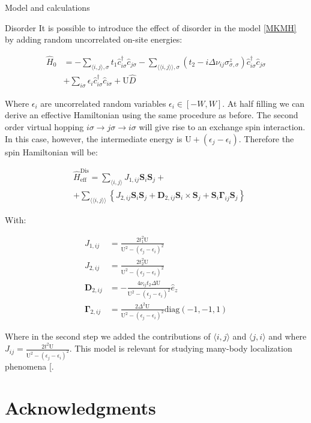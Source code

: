 \documentclass[aps,prl,twocolumn,amsmath,amssymb,superscriptaddress,nobibnotes]{revtex4}%
\renewcommand{\cite}[1]{{[}\onlinecite{#1}{]}}
\newcommand{\n}{\nonumber}
\newcommand{\bs}{\boldsymbol}
\begin{document}
\begin{section}{Model and calculations}
\begin{subsection}{Disorder}
It is possible to introduce the effect of disorder in the model \ref{MKMH} by adding random uncorrelated on-site energies:

\begin{align}
\label{DisorderedHubbardModel}
\hat{H}_0 &= - \sum_{\langle i,j \rangle, \sigma} t_1\hat{c}_{i \sigma}^\dagger \hat{c}_{j \sigma} -\sum_{\langle \langle i,j \rangle \rangle, \sigma}(t_2 - i\Delta\nu_{ij}\sigma^z_{\sigma, \sigma})\hat{c}_{i \sigma}^\dagger \hat{c}_{j \sigma} \n \\
	& + \sum_{i \sigma} \epsilon_i \hat{c}_{i \sigma}^\dagger \hat{c}_{i \sigma} +
	\text{U}\hat{D}
\end{align}

Where $\epsilon_i$ are uncorrelated random variables $\epsilon_i \in [-W,W]$. At half filling we can derive an effective Hamiltonian using the same procedure as before. The second order virtual hopping $i\sigma \rightarrow j\sigma \rightarrow i\sigma$ will give rise to an exchange spin interaction. In this case, however, the intermediate energy is $\text{U} + (\epsilon_j - \epsilon_i)$. Therefore the spin Hamiltonian will be:

\begin{align}
&\hat{H}_{\text{eff}}^{\text{Dis}} = \sum_{\langle i,j \rangle} J_{1,ij}\bs{S}_i\bs{S}_j +\n \\
&+ \sum_{\langle \langle i,j \rangle \rangle} \left\{ J_{2,ij}\bs{S}_i\bs{S}_j + \bs{D}_{2,ij} \bs{S}_i \times \bs{S}_j + \bs{S}_i \bs{\Gamma}_{ij} \bs{S}_j \right\}
\end{align}

With:

\begin{align*}
J_{1,ij} &= \frac{2t_1^2\text{U}}{\text{U}^2-(\epsilon_j-\epsilon_i)^2} \\
J_{2,ij} &= \frac{2t_2^2\text{U}}{\text{U}^2-(\epsilon_j-\epsilon_i)^2} \\
\bs{D}_{2,ij} &= -\frac{4\nu_{ij} t_2 \Delta \text{U}}{\text{U}^2-(\epsilon_j-\epsilon_i)^2}\hat{e}_z \\
\bs{\Gamma}_{2,ij} &= \frac{2\Delta^2\text{U}}{\text{U}^2-(\epsilon_j-\epsilon_i)^2}\text{diag}(-1,-1,1)
\end{align*}

Where in the second step we added the contributions of $\langle i,j \rangle$ and $\langle j,i \rangle$ and where $J_{ij} = \frac{2t^2\text{U}}{\text{U}^2-(\epsilon_j-\epsilon_i)^2}$. This model is relevant for studying many-body localization phenomena \cite{Protopopov}.
\end{subsection}

\end{section}

\section*{Acknowledgments}


\end{document}
